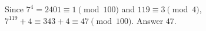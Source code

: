 Since $7^4=2401\equiv1\pmod{100}$ and $119\equiv3\pmod4$, $7^{119}+4\equiv343+4\equiv47\pmod{100}$. Answer $\boxed{47}$.

